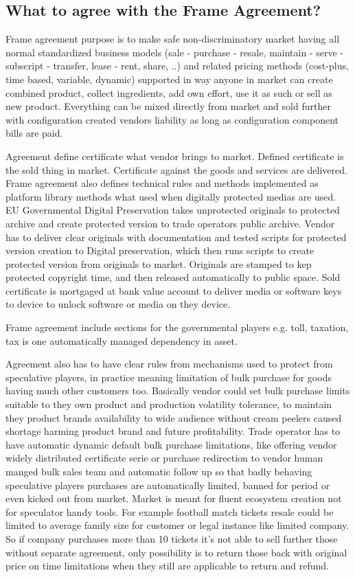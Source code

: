 \subsection{What to agree with the Frame Agreement?}
\label{frame_agreement_what}
Frame agreement purpose is to make safe non-discriminatory market having all normal standardized business models (sale - purchase - resale, maintain - serve - subscript - transfer, lease - rent, share, ..) and related pricing methods (cost-plus, time based, variable, dynamic) supported in way anyone in market can create combined product, collect ingredients, add own effort, use it as such or sell as new product. Everything can be mixed directly from market and sold further with configuration created vendors liability as long as configuration component bills are paid.

Agreement define certificate what vendor brings to market. Defined certificate is the sold thing in market. Certificate against the goods and services are delivered. Frame agreement also defines technical rules and methods implemented as platform library methods what used when digitally protected medias are used. EU Governmental Digital Preservation takes unprotected originals to protected archive and create protected version to trade operators public archive. Vendor has to deliver clear originals with documentation and tested scripts for protected version creation to Digital preservation, which then runs scripts to create protected version from originals to market. Originals are stamped to kep protected copyright time, and then released automatically to public space. Sold certificate is mortgaged at bank value account to deliver media or software keys to device to unlock software or media on they device.

Frame agreement include sections for the governmental players e.g. toll, taxation, tax is one automatically managed dependency in asset.

Agreement also has to have clear rules from mechanisms used to protect from speculative players, in practice meaning limitation of bulk purchase for goods having much other customers too. Basically vendor could set bulk purchase limits suitable to they own product and production volatility tolerance, to maintain they product brands availability to wide audience without cream peelers caused shortage harming product brand and future profitability. Trade operator has to have automatic dynamic default bulk purchase limitations, like offering vendor widely distributed certificate serie or purchase redirection to vendor human manged bulk sales team and automatic follow up so that badly behaving speculative players purchases are automatically limited, banned for period or even kicked out from market. Market is meant for fluent ecosystem creation not for speculator handy tools. For example football match tickets resale could be limited to average family size for customer or legal instance like limited company. So if company purchases more than 10 tickets it's not able to sell further those without separate agreement, only possibility is to return those back with original price on time limitations when they still are applicable to return and refund. 

